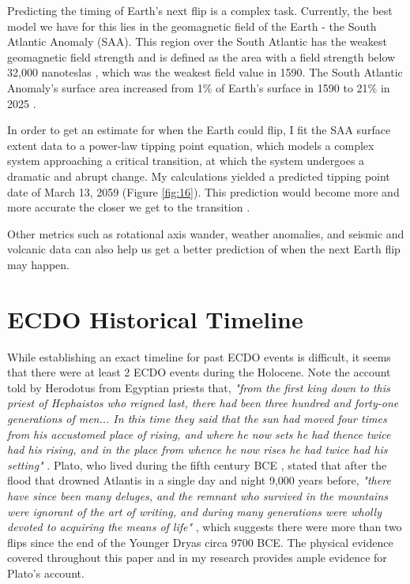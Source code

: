\documentclass[10pt,twocolumn,letterpaper]{article}
\begin{document}
Predicting the timing of Earth's next flip is a complex task. Currently, the best model we have for this lies in the geomagnetic field of the Earth - the South Atlantic Anomaly (SAA). This region over the South Atlantic has the weakest geomagnetic field strength and is defined as the area with a field strength below 32,000 nanoteslas \cite{135}, which was the weakest field value in 1590. The South Atlantic Anomaly's surface area increased from 1\% of Earth's surface in 1590 to 21\% in 2025 \cite{136}.

In order to get an estimate for when the Earth could flip, I fit the SAA surface extent data to a power-law tipping point equation, which models a complex system approaching a critical transition, at which the system undergoes a dramatic and abrupt change. My calculations yielded a predicted tipping point date of March 13, 2059 (Figure \ref{fig:16}). This prediction would become more and more accurate the closer we get to the transition \cite{136}.

Other metrics such as rotational axis wander, weather anomalies, and seismic and volcanic data can also help us get a better prediction of when the next Earth flip may happen.

\section{ECDO Historical Timeline}

While establishing an exact timeline for past ECDO events is difficult, it seems that there were at least 2 ECDO events during the Holocene. Note the account told by Herodotus from Egyptian priests that, \textit{"from the first king down to this priest of Hephaistos who reigned last, there had been three hundred and forty-one generations of men... In this time they said that the sun had moved four times from his accustomed place of rising, and where he now sets he had thence twice had his rising, and in the place from whence he now rises he had twice had his setting"} \cite{32}. Plato, who lived during the fifth century BCE \cite{111}, stated that after the flood that drowned Atlantis in a single day and night 9,000 years before, \textit{"there have since been many deluges, and the remnant who survived in the mountains were ignorant of the art of writing, and during many generations were wholly devoted to acquiring the means of life"} \cite{112}, which suggests there were more than two flips since the end of the Younger Dryas circa 9700 BCE. The physical evidence covered throughout this paper and in my research \cite{2} provides ample evidence for Plato's account.
\end{document}
